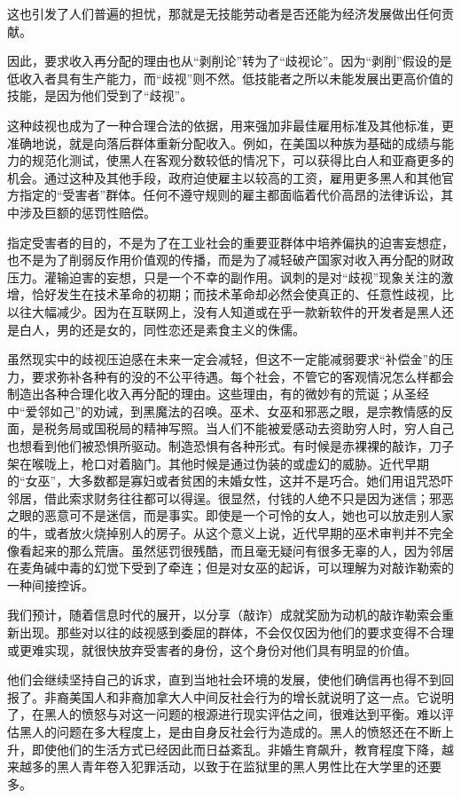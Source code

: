 这也引发了人们普遍的担忧，那就是无技能劳动者是否还能为经济发展做出任何贡献。

因此，要求收入再分配的理由也从“剥削论”转为了“歧视论”。因为“剥削”假设的是低收入者具有生产能力，而“歧视”则不然。低技能者之所以未能发展出更高价值的技能，是因为他们受到了“歧视”。

这种歧视也成为了一种合理合法的依据，用来强加非最佳雇用标准及其他标准，更准确地说，就是向落后群体重新分配收入。例如，在美国以种族为基础的成绩与能力的规范化测试，使黑人在客观分数较低的情况下，可以获得比白人和亚裔更多的机会。通过这种及其他手段，政府迫使雇主以较高的工资，雇用更多黑人和其他官方指定的“受害者”群体。任何不遵守规则的雇主都面临着代价高昂的法律诉讼，其中涉及巨额的惩罚性赔偿。

指定受害者的目的，不是为了在工业社会的重要亚群体中培养偏执的迫害妄想症，也不是为了削弱反作用价值观的传播，而是为了减轻破产国家对收入再分配的财政压力。灌输迫害的妄想，只是一个不幸的副作用。讽刺的是对“歧视”现象关注的激增，恰好发生在技术革命的初期；而技术革命却必然会使真正的、任意性歧视，比以往大幅减少。因为在互联网上，没有人知道或在乎一款新软件的开发者是黑人还是白人，男的还是女的，同性恋还是素食主义的侏儒。

虽然现实中的歧视压迫感在未来一定会减轻，但这不一定能减弱要求“补偿金”的压力，要求弥补各种有的没的不公平待遇。每个社会，不管它的客观情况怎么样都会制造出各种合理化收入再分配的理由。这些理由，有的微妙有的荒诞；从圣经中“爱邻如己”的劝诫，到黑魔法的召唤。巫术、女巫和邪恶之眼，是宗教情感的反面，是税务局或国税局的精神写照。当人们不能被爱感动去资助穷人时，穷人自己也想看到他们被恐惧所驱动。制造恐惧有各种形式。有时候是赤裸裸的敲诈，刀子架在喉咙上，枪口对着脑门。其他时候是通过伪装的或虚幻的威胁。近代早期的“女巫”，大多数都是寡妇或者贫困的未婚女性，这并不是巧合。她们用诅咒恐吓邻居，借此索求财务往往都可以得逞。很显然，付钱的人绝不只是因为迷信；邪恶之眼的恶意可不是迷信，而是事实。即使是一个可怜的女人，她也可以放走别人家的牛，或者放火烧掉别人的房子。从这个意义上说，近代早期的巫术审判并不完全像看起来的那么荒唐。虽然惩罚很残酷，而且毫无疑问有很多无辜的人，因为邻居在麦角碱中毒的幻觉下受到了牵连；但是对女巫的起诉，可以理解为对敲诈勒索的一种间接控诉。

我们预计，随着信息时代的展开，以分享（敲诈）成就奖励为动机的敲诈勒索会重新出现。那些对以往的歧视感到委屈的群体，不会仅仅因为他们的要求变得不合理或更难实现，就很快放弃受害者的身份，这个身份对他们具有明显的价值。

他们会继续坚持自己的诉求，直到当地社会环境的发展，使他们确信再也得不到回报了。非裔美国人和非裔加拿大人中间反社会行为的增长就说明了这一点。它说明了，在黑人的愤怒与对这一问题的根源进行现实评估之间，很难达到平衡。难以评估黑人的问题在多大程度上，是由自身反社会行为造成的。黑人的愤怒还在不断上升，即使他们的生活方式已经因此而日益紊乱。非婚生育飙升，教育程度下降，越来越多的黑人青年卷入犯罪活动，以致于在监狱里的黑人男性比在大学里的还要多。

